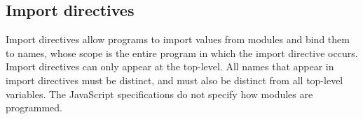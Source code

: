 \subsection*{Import directives}

Import directives allow programs to import values from modules and bind them to names, whose scope
is the entire program in which the import directive occurs.  Import directives can only appear at the top-level.  All names that appear in import directives
must be distinct, and must also be distinct from all top-level variables.  The JavaScript specifications do not specify how modules are
programmed.
